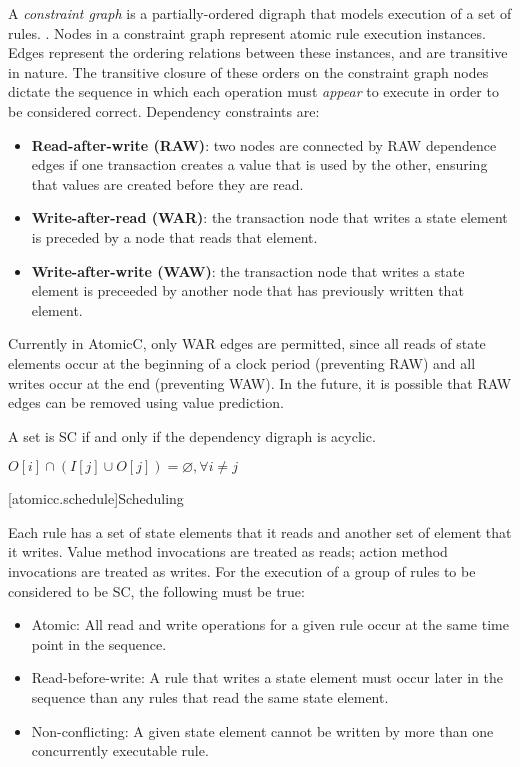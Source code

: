 A \textit{constraint graph} is a partially-ordered digraph that models
execution of a set of rules.
\cite[Sec.~3]{Cain2003}.
Nodes in a constraint graph represent atomic rule execution instances.  Edges
represent the ordering relations between these instances, and are transitive in nature.
The transitive closure of these orders on the constraint graph nodes
dictate the sequence in which each operation must \textit{appear} to execute in
order to be considered correct.
Dependency constraints are:
\begin{itemize}
\item \textbf{Read-after-write (RAW)}: two nodes are connected by RAW dependence
edges if one transaction creates a value that is used by the other, ensuring
that values are created before they are read.
\item \textbf{Write-after-read (WAR)}: the transaction node that writes a state
element is preceded by a node that reads that element.
\item \textbf{Write-after-write (WAW)}: the transaction node that writes a state
element is preceeded by another node that has previously written that element.
\end{itemize}
Currently in AtomicC, only WAR edges are permitted, since all reads
of state elements occur at the beginning of a clock period (preventing RAW)
and all writes occur at the end (preventing WAW).
In the future, it is possible that RAW edges can be removed using value prediction.

A set is SC if and only if the dependency digraph is acyclic.

$O[i] \cap (I[j] \cup O[j]) = \varnothing, \forall i \neq j $
\cite[Sec.~7.3]{GrayR93}

[atomicc.schedule]{Scheduling}

Each rule has a set of state elements that it reads and another set of element that it writes.
Value method invocations are treated as reads; action method invocations are treated as writes.
For the execution of a group of rules to be considered to be SC, the following must
be true:
\begin{itemize}
\item Atomic: All read and write operations for a given rule occur at the same time point in the sequence.
\item Read-before-write:  A rule that writes a state element must occur later in the sequence
than any rules that read the same state element.
\item Non-conflicting: A given state element cannot be written by more than one concurrently executable rule.
\end{itemize}

